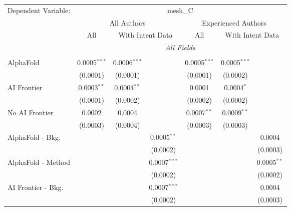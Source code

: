 \begingroup
\centering
\begin{tabular}{lcccccc}
   \tabularnewline \midrule \midrule
   Dependent Variable: & \multicolumn{6}{c}{mesh\_C}\\
 & \multicolumn{3}{c}{All Authors} & \multicolumn{3}{c}{Experienced Authors} \\
\cmidrule(lr){2-4} \cmidrule(lr){5-7}
 & \multicolumn{1}{c}{All} & \multicolumn{2}{c}{With Intent Data} & \multicolumn{1}{c}{All} & \multicolumn{2}{c}{With Intent Data} \\
\cmidrule(lr){2-2} \cmidrule(lr){3-4} \cmidrule(lr){5-5} \cmidrule(lr){6-7}
 & \multicolumn{6}{c}{\textit{All Fields}} \\ \\
   AlphaFold               & 0.0005$^{***}$ & 0.0006$^{***}$ &                & 0.0005$^{***}$ & 0.0005$^{***}$ &   \\   
                           & (0.0001)       & (0.0001)       &                & (0.0001)       & (0.0002)       &   \\   
   AI Frontier             & 0.0003$^{**}$  & 0.0004$^{**}$  &                & 0.0001         & 0.0004$^{*}$   &   \\   
                           & (0.0001)       & (0.0002)       &                & (0.0002)       & (0.0002)       &   \\   
   No AI Frontier          & 0.0002         & 0.0004         &                & 0.0007$^{**}$  & 0.0009$^{**}$  &   \\   
                           & (0.0003)       & (0.0004)       &                & (0.0003)       & (0.0003)       &   \\   
   AlphaFold - Bkg.        &                &                & 0.0005$^{**}$  &                &                & 0.0004\\   
                           &                &                & (0.0002)       &                &                & (0.0003)\\   
   AlphaFold - Method      &                &                & 0.0007$^{***}$ &                &                & 0.0005$^{**}$\\   
                           &                &                & (0.0002)       &                &                & (0.0002)\\   
   AI Frontier - Bkg.      &                &                & 0.0007$^{***}$ &                &                & 0.0004\\   
                           &                &                & (0.0002)       &                &                & (0.0003)\\   

\end{tabular}
